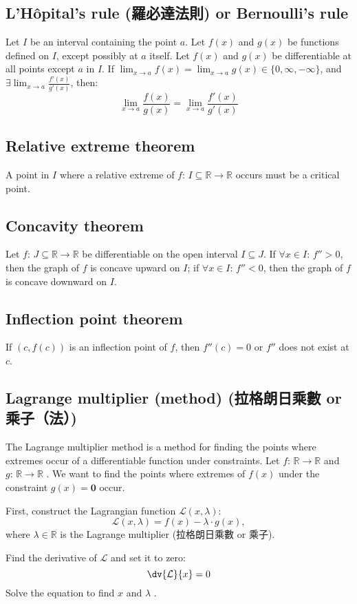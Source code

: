 \documentclass[a4paper,12pt]{report}
\begin{document}
\subsection{L'Hôpital's rule (羅必達法則) or Bernoulli's rule}
Let \(I\) be an interval containing the point \(a\). Let \( f(x) \) and \( g(x) \) be functions defined on \(I\), except possibly at \(a\) itself. Let \( f(x) \) and \( g(x) \) be differentiable at all points except $a$ in $I$. If $\lim_{x\to a}f(x)=\lim_{x\to a}g(x)\in\{0,\infty,-\infty\}$, and $\exists \lim_{x\to a}\frac{f'(x)}{g'(x)}$, then:
\[\lim_{x\to a}\frac{f(x)}{g(x)}=\lim_{x\to a}\frac{f'(x)}{g'(x)}\]
\subsection{Relative extreme theorem}
A point in $I$ where a relative extreme of $f:\,I\subseteq\mathbb{R}\to\mathbb{R}$ occurs must be a critical point.
\subsection{Concavity theorem}
Let $f:\,J\subseteq\mathbb{R}\to\mathbb{R}$ be differentiable on the open interval $I\subseteq J$. If $\forall x\in I:\,f''>0$, then the graph of $f$ is concave upward on $I$; if $\forall x\in I:\,f''<0$, then the graph of $f$ is concave downward on $I$.
\subsection{Inflection point theorem}
If $(c,f(c))$ is an inflection point of $f$, then $f''(c)=0$ or $f''$ does not exist at $c$.
\subsection{Lagrange multiplier (method) (拉格朗日乘數 or 乘子（法）)}
The Lagrange multiplier method is a method for finding the points where extremes occur of a differentiable function under constraints.
Let $f:\,\mathbb{R} \rightarrow \mathbb{R}$ and $g:\,\mathbb{R} \rightarrow \mathbb{R}$ . We want to find the points where extremes of \( f(x) \) under the constraint \( g(x) = \mathbf{0} \) occur. 

First, construct the Lagrangian function \( \mathcal{L}(x,\lambda) \):
\[\mathcal{L}(x,\lambda) = f(x) - \lambda \cdot g(x),\]
where \( \lambda\in\mathbb{R} \) is the Lagrange multiplier (拉格朗日乘數 or 乘子).

Find the derivative of $\mathcal{L}$ and set it to zero:
\[
\dv{\mathcal{L}}{x} = 0
\]
Solve the equation to find \( x \) and \( \lambda \) . 
\end{document}
